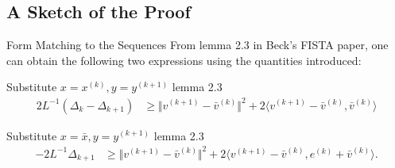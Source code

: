 \documentclass[11pt]{beamer}
\begin{document}
    \subsection{A Sketch of the Proof}
        \begin{frame}{Form Matching to the Sequences}
            From lemma 2.3 in Beck's FISTA paper, one can obtain the following two expressions using the quantities introduced: 
            \begin{block}{Substitute $x = x^{(k)}, y = y^{(k + 1)}$ lemma 2.3}
                {\scriptsize
                    \begin{align*}
                        2L^{-1} (\Delta_k - \Delta_{k + 1})  
                        & \ge 
                        \Vert 
                            v^{(k + 1)} - \bar v^{(k)}
                        \Vert^2
                        + 
                        2\langle v^{(k + 1)} - \bar v^{(k)}, \bar v^{(k)}\rangle
                        \tag{*}
                    \end{align*}
                }
            \end{block}
            \begin{block}{Substitute $x = \bar x, y = y^{(k + 1)}$ lemma 2.3}
                {\scriptsize
                    \begin{align*}
                        -2L^{-1}\Delta_{k + 1} 
                        & \ge 
                        \Vert 
                            v^{(k + 1)} - \bar v^{(k)}
                        \Vert^2 + 
                        2\langle  
                            v^{(k + 1)} - \bar v^{(k)},
                            e^{(k)} + \bar v^{(k)}
                        \rangle.
                        \tag{$\star$}
                    \end{align*}
                }
            \end{block}
        \end{frame}
\end{document}
